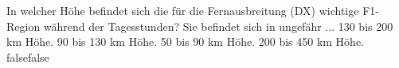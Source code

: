     {In welcher Höhe befindet sich die für die Fernausbreitung (DX) wichtige F1-Region während der Tagesstunden? Sie befindet sich in ungefähr ...}
    {130 bis 200 km Höhe.}
    {90 bis 130 km Höhe.}
    {50 bis 90 km Höhe.}
    {200 bis 450 km Höhe.}
    {false}{false}